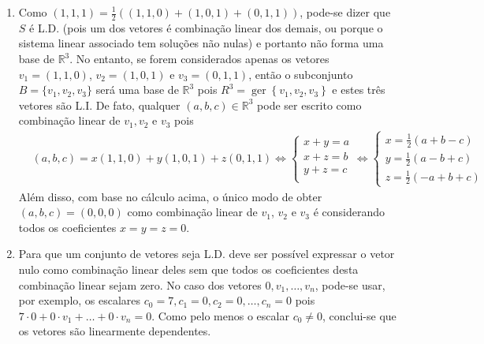 \documentclass[12pt,a4paper]{article}
\newcommand*\ger[1]{\operatorname{ger}\left\{#1\right\}}
\newcommand*\R{\mathbb{R}}
\begin{document}
\begin{enumerate}
\item Como $(1,1,1) = \frac{1}{2} \left( (1,1,0) + (1,0,1) + (0,1,1) \right)$, pode-se dizer que $S$ é L.D. (pois um dos vetores é combinação linear dos demais, ou porque o sistema linear associado tem soluções não nulas) e portanto não forma uma base de $\R^3$. No entanto, se forem considerados apenas os vetores $v_1 = (1,1,0)$, $v_2 = (1,0,1)$ e $v_3 = (0,1,1)$, então o subconjunto $B = \{ v_1, v_2, v_3 \}$ será uma base de $\R^3$ pois $R^3 = \ger{ v_1, v_2, v_3 }$ e estes três vetores são L.I. De fato, qualquer $(a,b,c) \in \R^3$ pode ser escrito como combinação linear de $v_1, v_2$ e $v_3$ pois
\begin{align*}
& (a,b,c) = x(1,1,0) + y(1,0,1) + z(0,1,1)
\Leftrightarrow
\begin{cases}
x+y=a\\
x+z=b\\
y+z=c\\
\end{cases}
\Leftrightarrow
\begin{cases}
x=\frac{1}{2}( a+b-c)\\
y=\frac{1}{2}( a-b+c)\\
z=\frac{1}{2}(-a+b+c)
\end{cases}
\end{align*}
Além disso, com base no cálculo acima, o único modo de obter $(a,b,c) = (0,0,0)$ como combinação linear de $v_1$, $v_2$ e $v_3$ é considerando todos os coeficientes $x=y=z=0$.

\item Para que um conjunto de vetores seja L.D. deve ser possível expressar o vetor nulo como combinação linear deles sem que todos os coeficientes desta combinação linear sejam zero. No caso dos vetores $0, v_1, \ldots, v_n$, pode-se usar, por exemplo, os escalares $c_0 =7, c_1 = 0, c_2 = 0, \ldots, c_n = 0$ pois $7 \cdot 0 + 0 \cdot v_1 + \ldots + 0 \cdot v_n = 0$. Como pelo menos o escalar $c_0 \neq 0$, conclui-se que os vetores são linearmente dependentes.


\end{enumerate}
\end{document}
